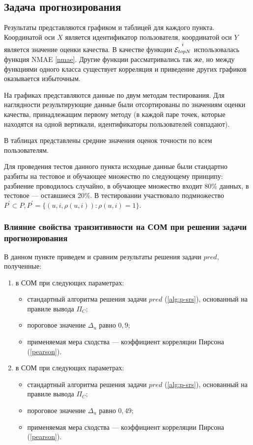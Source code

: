 \subsection{Задача прогнозирования}
Результаты представляются графиком и таблицей для каждого пункта.
Координатой оси $X$ является идентификатор пользователя, координатой
оси $Y$ является значение оценки качества.
В качестве функции ${\overset{i}{\mathcal{E}_{topN}}}$ использовалась функция
NMAE \ref{nmae}.
Другие функции рассматривались так же, но между
функциями одного класса существует корреляция и приведение других графиков
оказывается избыточным.

На графиках представляются данные по двум методам тестирования. Для наглядности
результирующие данные были отсортированы по значениям оценки качества,
принадлежащим первому методу (в каждой паре точек, которые находятся на одной
вертикали, идентификаторы пользователей совпадают).

В таблицах представлены средние значения оценок точности по всем пользователям.

Для проведения тестов данного пункта исходные данные были
стандартно разбиты на тестовое и обучающее множество по следующему принципу:
разбиение проводилось случайно, в обучающее множество входит
80\% данных, в тестовое --- оставшиеся 20\%. В тестировании участвовало
подмножество $P^{\prime} \subset P, P^{\prime} = \{(u, i, \rho(u, i)):
\rho(u, i) = 1\}$.

\subsubsection{Влияние свойства транзитивности на СОМ при решении задачи
прогнозирования}
В данном пункте приведем и сравним результаты решения задачи $pred$, полученные:
\begin{enumerate}
	\item  в СОМ при следующих параметрах:
		\begin{itemize}
			\item
			стандартный алгоритма решения задачи
			$pred$ (\ref{alg:p-srs}), основанный на
			правиле вывода $\Pi_C$;
			\item
			пороговое значение $\Delta_u$ равно $0,9$;
			\item
		применяемая мера сходства --- коэффициент корреляции Пирсона
				(\ref{pearson}).
		\end{itemize}
	\item  в СОМ при следующих параметрах:
		\begin{itemize}
			\item
			стандартный алгоритма решения задачи
			$pred$ (\ref{alg:p-srs}), основанный на
			правиле вывода $\Pi_C$;
			\item
			пороговое значение $\Delta_u$ равно $0,49$;
			\item
		применяемая мера сходства --- коэффициент корреляции Пирсона
				(\ref{pearson}).
		\end{itemize}
\end{enumerate}

